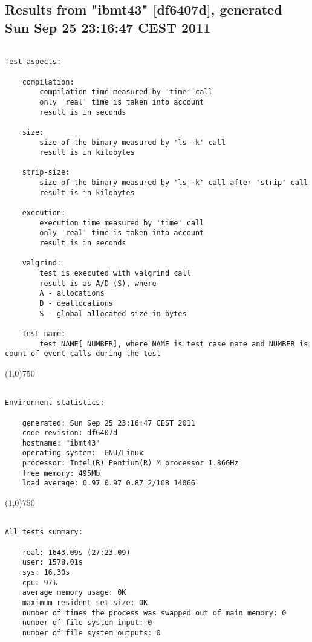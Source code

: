 \clearpage
\subsection{Results from "ibmt43" [df6407d], generated Sun Sep 25 23:16:47 CEST 2011}
\begin{verbatim}

Test aspects:

    compilation:
        compilation time measured by 'time' call
        only 'real' time is taken into account
        result is in seconds

    size:
        size of the binary measured by 'ls -k' call
        result is in kilobytes

    strip-size:
        size of the binary measured by 'ls -k' call after 'strip' call
        result is in kilobytes

    execution:
        execution time measured by 'time' call
        only 'real' time is taken into account
        result is in seconds

    valgrind:
        test is executed with valgrind call
        result is as A/D (S), where
        A - allocations
        D - deallocations
        S - global allocated size in bytes

    test name:
        test_NAME[_NUMBER], where NAME is test case name and NUMBER is count of event calls during the test
\end{verbatim}
\begin{center}
\line(1,0){750}
\end{center}
\begin{verbatim}

Environment statistics:

    generated: Sun Sep 25 23:16:47 CEST 2011
    code revision: df6407d
    hostname: "ibmt43"
    operating system:  GNU/Linux
    processor: Intel(R) Pentium(R) M processor 1.86GHz
    free memory: 495Mb
    load average: 0.97 0.97 0.87 2/108 14066
\end{verbatim}
\begin{center}
\line(1,0){750}
\end{center}
\begin{verbatim}

All tests summary:

    real: 1643.09s (27:23.09)
    user: 1578.01s
    sys: 16.30s
    cpu: 97%
    average memory usage: 0K
    maximum resident set size: 0K
    number of times the process was swapped out of main memory: 0
    number of file system input: 0
    number of file system outputs: 0
\end{verbatim}
